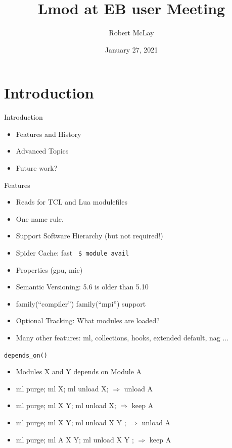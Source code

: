 \documentclass{beamer}
\begin{document}
\title[Lmod]{Lmod at EB user Meeting}
\author{Robert McLay} 
\date{January 27, 2021}

\frame{\titlepage} 

\section{Introduction}

\begin{frame}{Introduction}
  \begin{itemize}
    \item Features and History
    \item Advanced Topics
    \item Future work?
  \end{itemize}
\end{frame}

\begin{frame}{Features}
  \begin{itemize}
    \item Reads for TCL and Lua modulefiles
    \item One name rule.
    \item Support Software Hierarchy (but not required!)
    \item Spider Cache: fast \texttt{\color{blue} \$ module avail}
    \item Properties (gpu, mic)
    \item Semantic Versioning:  5.6 is older than 5.10
    \item family(``compiler'') family(``mpi'') support
    \item Optional Tracking: What modules are loaded?
    \item Many other features: ml, collections, hooks,
      extended default, nag ...
  \end{itemize}
\end{frame}

\begin{frame}{\texttt{depends\_on()}}
  \begin{itemize}
    \item Modules X and Y depends on Module A
    \item ml purge; ml X; ml unload X;      $\Rightarrow$ unload A
    \item ml purge; ml X Y; ml unload X;    $\Rightarrow$ keep A
    \item ml purge; ml X Y; ml unload X Y ; $\Rightarrow$ unload A
    \item ml purge; ml A X Y; ml unload X Y ; $\Rightarrow$ keep A
  \end{itemize}
\end{frame}
\end{document}
